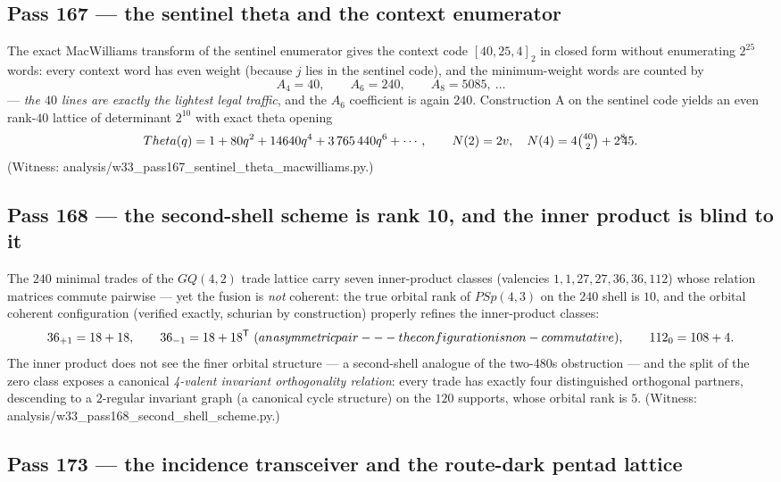 \documentclass[12pt,a4paper]{article}
\def\mathrm#1{#1}%
\def\mathbf#1{#1}%
\def\texttt#1{#1}%
\def\text#1{#1}%
\def\Theta{Theta}%
\def\cdot{ }%
\theoremstyle{definition}
\newcommand{\GQ}{\mathrm{GQ}}
\newcommand{\PSp}{\mathrm{PSp}}
\begin{document}
\subsection{Pass 167 --- the sentinel theta and the context enumerator}
\label{ssec:pass167}

The exact MacWilliams transform of the sentinel enumerator gives the
context code $[40,25,4]_2$ in closed form without enumerating $2^{25}$
words: every context word has even weight (because $\mathbf j$ lies in the
sentinel code), and the minimum-weight words are counted by
\[
  A_4=40,\qquad A_6=240,\qquad A_8=5085,\ \ldots
\]
--- \emph{the $40$ lines are exactly the lightest legal traffic}, and the
$A_6$ coefficient is again $240$. Construction A on the sentinel code
yields an even rank-$40$ lattice of determinant $2^{10}$ with exact theta
opening
\[
  \Theta(q)=1+80q^2+14640q^4+3\,765\,440q^6+\cdots,
\qquad
  N(2)=2v,\quad N(4)=4\tbinom{40}{2}+2^8\!\cdot\!45 .
\]
(Witness: \texttt{analysis/w33\_pass167\_sentinel\_theta\_macwilliams.py}.)

\subsection{Pass 168 --- the second-shell scheme is rank 10, and the inner
product is blind to it}
\label{ssec:pass168}

The $240$ minimal trades of the $\GQ(4,2)$ trade lattice carry seven
inner-product classes (valencies $1,1,27,27,36,36,112$) whose relation
matrices commute pairwise --- yet the fusion is \emph{not} coherent: the
true orbital rank of $\PSp(4,3)$ on the $240$ shell is $\mathbf{10}$, and
the orbital coherent configuration (verified exactly, schurian by
construction) properly refines the inner-product classes:
\[
  36_{+1}=18+18,\qquad
  36_{-1}=18+18^{\mathsf T}\ \text{(an \emph{asymmetric} pair --- the
  configuration is non-commutative)},\qquad
  112_{0}=108+\mathbf 4 .
\]
The inner product does not see the finer orbital structure --- a
second-shell analogue of the two-480s obstruction --- and the split of the
zero class exposes a canonical \emph{4-valent invariant orthogonality
relation}: every trade has exactly four distinguished orthogonal partners,
descending to a $2$-regular invariant graph (a canonical cycle structure)
on the $120$ supports, whose orbital rank is $5$. (Witness:
\texttt{analysis/w33\_pass168\_second\_shell\_scheme.py}.)

\subsection{Pass 173 --- the incidence transceiver and the route-dark
pentad lattice}
\label{ssec:pass173}
\end{document}
